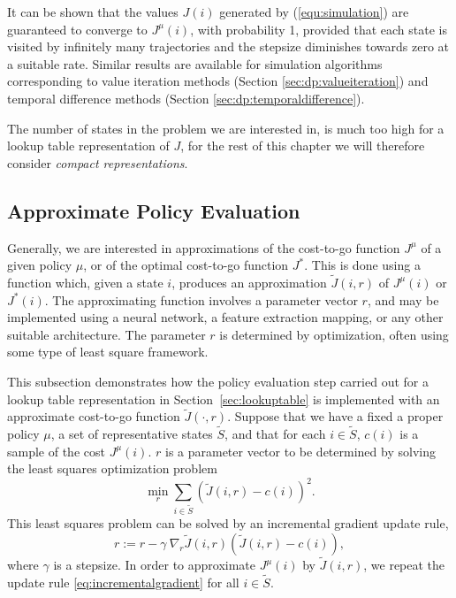 It can be shown that the values $J(i)$ generated by (\ref{equ:simulation}) are guaranteed to converge to $J^\mu(i)$, with probability 1, provided that each state is visited by infinitely many trajectories and the stepsize diminishes towards zero at a suitable rate. Similar results are available for simulation algorithms corresponding to value iteration methods (Section \ref{sec:dp:valueiteration}) and temporal difference methods (Section \ref{sec:dp:temporaldifference}).

The number of states in the problem we are interested in, is much too high for a lookup table representation of $J$, for the rest of this chapter we will therefore consider \emph{compact representations}. 














\subsection{Approximate Policy Evaluation} \label{sec:approx:eval}
Generally, we are interested in approximations of the cost-to-go function $J^\mu$ of a given policy $\mu$, or of the optimal cost-to-go function $J^*$. This is done using a function which, given a state $i$, produces an approximation $\tilde J(i,r)$ of $J^\mu(i)$ or $J^*(i)$. The approximating function involves a parameter vector $r$, and may be implemented using a neural network, a feature extraction mapping, or any other suitable architecture. The parameter $r$ is determined by optimization, often using some type of least square framework.

This subsection demonstrates how the policy evaluation step carried out for a lookup table representation in Section~\ref{sec:lookuptable} is implemented with an approximate cost-to-go function $\tilde J(\cdot,r)$. Suppose that we have a fixed a proper policy $\mu$, a set of representative states $\tilde S$, and that for each $i \in \tilde S$, $c(i)$ is a sample of the cost $J^\mu(i)$. $r$ is a parameter vector to be determined by solving the least squares optimization problem
\begin{equation} \label{equ:leastsquares}
\min_r \sum_{i \in \tilde S} \left( \tilde J(i,r) - c(i)\right)^2.
\end{equation}
This least squares problem can be solved by an incremental gradient update rule, 
\begin{equation} \label{eq:incrementalgradient}
r := r - \gamma~\nabla_r\tilde J(i,r) \left( \tilde J(i,r) - c(i)\right),
\end{equation}
where $\gamma$ is a stepsize. In order to approximate $J^\mu(i)$ by $\tilde J(i,r)$, we repeat the update rule \ref{eq:incrementalgradient} for all $i \in \tilde S$.


